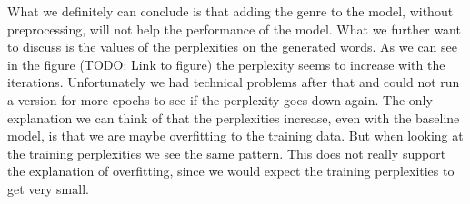 %
What we definitely can conclude is that adding the genre to the model, without preprocessing, will not help the performance of the model.
%
\newline
%
What we further want to discuss is the values of the perplexities on the generated words.
%
As we can see in the figure (TODO: Link to figure) the perplexity seems to increase with the iterations. 
%
Unfortunately we had technical problems after that and could not run a version for more epochs to see if the perplexity goes down again.
%
The only explanation we can think of that the perplexities increase, even with the baseline model, is that we are maybe overfitting to the training data.
%
But when looking at the training perplexities we see the same pattern. 
%
This does not really support the explanation of overfitting, since we would expect the training perplexities to get very small.